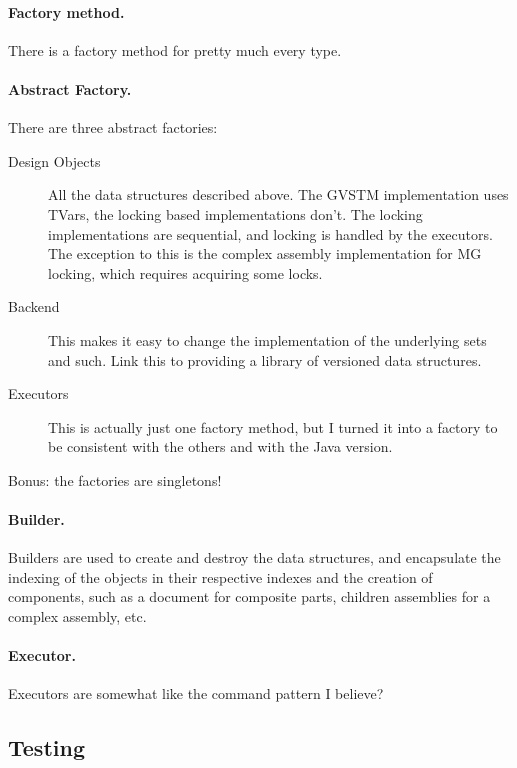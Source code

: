 \documentclass[12pt,a4paper,oneside,openright]{report}
\begin{document}
\paragraph{Factory method.}
There is a factory method for pretty much every type.

\paragraph{Abstract Factory.}
There are three abstract factories:

\begin{description}
\item[Design Objects] All the data structures described above. The
  GVSTM implementation uses TVars, the locking based implementations
  don't. The locking implementations are sequential, and locking is
  handled by the executors. The exception to this is the complex
  assembly implementation for MG locking, which requires acquiring
  some locks.
\item[Backend] This makes it easy to change the implementation of the
  underlying sets and such. Link this to providing a library of
  versioned data structures.
\item[Executors] This is actually just one factory method, but I
  turned it into a factory to be consistent with the others and with
  the Java version.
\end{description}

Bonus: the factories are singletons!

\paragraph{Builder.}

Builders are used to create and destroy the data structures, and
encapsulate the indexing of the objects in their respective indexes
and the creation of components, such as a document for composite
parts, children assemblies for a complex assembly, etc.

\paragraph{Executor.}

Executors are somewhat like the command pattern I believe?

\subsection{Testing}
\label{sec:impl:testing}
\end{document}
